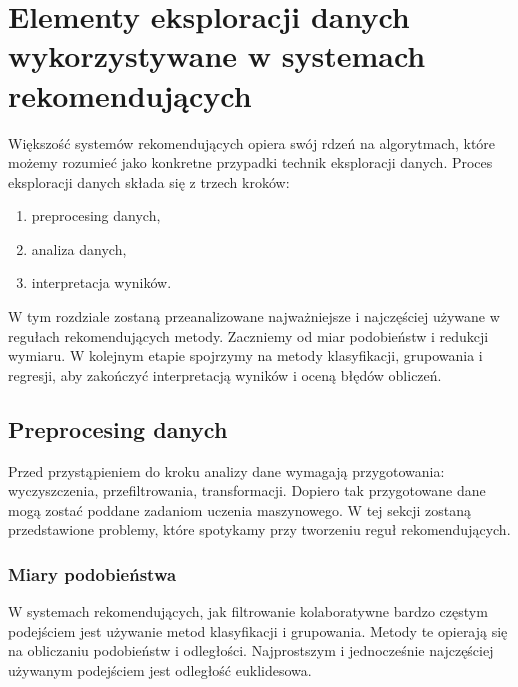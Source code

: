 \documentclass[12pt,a4paper]{report}
\begin{document}
\chapter{Elementy eksploracji danych wykorzystywane w systemach rekomendujących}
Większość systemów rekomendujących opiera swój rdzeń na algorytmach, które możemy rozumieć jako konkretne przypadki technik eksploracji danych. 
Proces eksploracji danych składa się z trzech kroków:
\begin{enumerate}
\item preprocesing danych,
\item analiza danych,
\item interpretacja wyników.
\end{enumerate}
W tym rozdziale zostaną przeanalizowane najważniejsze i najczęściej używane w regułach rekomendujących metody. Zaczniemy od miar podobieństw i redukcji wymiaru. W kolejnym etapie spojrzymy na metody klasyfikacji, grupowania i regresji, aby zakończyć interpretacją wyników i oceną błędów obliczeń.
\section{Preprocesing danych}
Przed przystąpieniem do kroku analizy dane wymagają przygotowania: wyczyszczenia, przefiltrowania, transformacji. Dopiero tak przygotowane dane mogą zostać poddane zadaniom uczenia maszynowego. W tej sekcji zostaną przedstawione problemy, które spotykamy przy tworzeniu reguł rekomendujących.
\subsection{Miary podobieństwa}
W systemach rekomendujących, jak filtrowanie kolaboratywne bardzo częstym podejściem jest używanie metod klasyfikacji i grupowania. Metody te opierają się na obliczaniu podobieństw i odległości.
Najprostszym i jednocześnie najczęściej używanym podejściem jest odległość euklidesowa.
\end{document}
